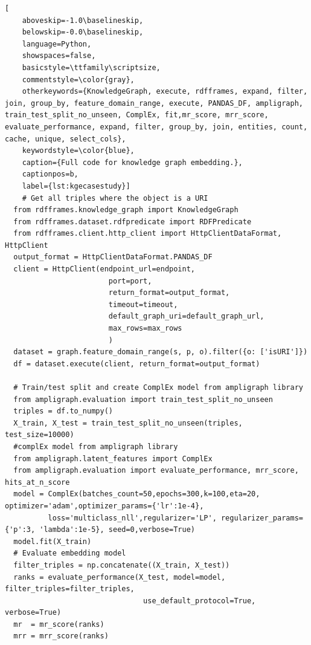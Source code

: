 \vspace*{8pt}
  \begin{lstlisting}[
    aboveskip=-1.0\baselineskip,
    belowskip=-0.0\baselineskip,
    language=Python,
    showspaces=false,
    basicstyle=\ttfamily\scriptsize,
    commentstyle=\color{gray},
    otherkeywords={KnowledgeGraph, execute, rdfframes, expand, filter, join, group_by, feature_domain_range, execute, PANDAS_DF, ampligraph, train_test_split_no_unseen, ComplEx, fit,mr_score, mrr_score, evaluate_performance, expand, filter, group_by, join, entities, count, cache, unique, select_cols},
    keywordstyle=\color{blue},
    caption={Full code for knowledge graph embedding.},
    captionpos=b,
    label={lst:kgecasestudy}]
    # Get all triples where the object is a URI
  from rdfframes.knowledge_graph import KnowledgeGraph
  from rdfframes.dataset.rdfpredicate import RDFPredicate
  from rdfframes.client.http_client import HttpClientDataFormat, HttpClient    
  output_format = HttpClientDataFormat.PANDAS_DF
  client = HttpClient(endpoint_url=endpoint,
                        port=port,
                        return_format=output_format,
                        timeout=timeout,
                        default_graph_uri=default_graph_url,
                        max_rows=max_rows
                        )
  dataset = graph.feature_domain_range(s, p, o).filter({o: ['isURI']})
  df = dataset.execute(client, return_format=output_format)
    
  # Train/test split and create ComplEx model from ampligraph library
  from ampligraph.evaluation import train_test_split_no_unseen 
  triples = df.to_numpy()
  X_train, X_test = train_test_split_no_unseen(triples, test_size=10000)
  #complEx model from ampligraph library
  from ampligraph.latent_features import ComplEx
  from ampligraph.evaluation import evaluate_performance, mrr_score, hits_at_n_score
  model = ComplEx(batches_count=50,epochs=300,k=100,eta=20, optimizer='adam',optimizer_params={'lr':1e-4}, 
          loss='multiclass_nll',regularizer='LP', regularizer_params={'p':3, 'lambda':1e-5}, seed=0,verbose=True)
  model.fit(X_train)
  # Evaluate embedding model
  filter_triples = np.concatenate((X_train, X_test))
  ranks = evaluate_performance(X_test, model=model, filter_triples=filter_triples,
                                use_default_protocol=True, verbose=True)
  mr  = mr_score(ranks)
  mrr = mrr_score(ranks)
  \end{lstlisting}

\pagebreak

